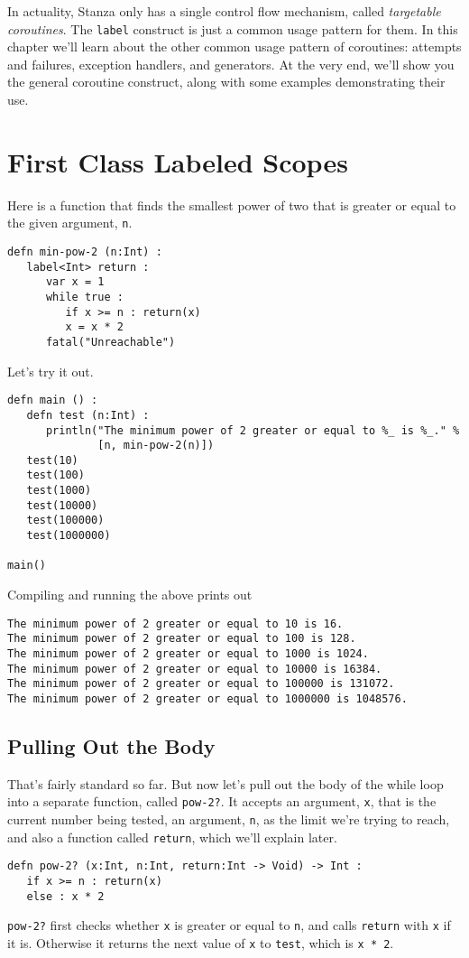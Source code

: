 \documentclass[10pt,oneside]{book}
\begin{document}
In actuality, Stanza only has a single control flow mechanism, called {\em targetable coroutines}. The \texttt{\frenchspacing label} construct is just a common usage pattern for them. In this chapter we'll learn about the other common usage pattern of coroutines: attempts and failures, exception handlers, and generators. At the very end, we'll show you the general coroutine construct, along with some examples demonstrating their use.

\section{First Class Labeled Scopes}
Here is a function that finds the smallest power of two that is greater or equal to the given argument, \texttt{\frenchspacing n}.
\begin{lstlisting}
defn min-pow-2 (n:Int) :
   label<Int> return :
      var x = 1
      while true :
         if x >= n : return(x)
         x = x * 2
      fatal("Unreachable")   
\end{lstlisting}

Let's try it out.
\begin{lstlisting}
defn main () :
   defn test (n:Int) :
      println("The minimum power of 2 greater or equal to %_ is %_." %
              [n, min-pow-2(n)])
   test(10)
   test(100)
   test(1000)
   test(10000)
   test(100000)
   test(1000000)

main()
\end{lstlisting}

Compiling and running the above prints out
\begin{lstlisting}
The minimum power of 2 greater or equal to 10 is 16.
The minimum power of 2 greater or equal to 100 is 128.
The minimum power of 2 greater or equal to 1000 is 1024.
The minimum power of 2 greater or equal to 10000 is 16384.
The minimum power of 2 greater or equal to 100000 is 131072.
The minimum power of 2 greater or equal to 1000000 is 1048576.
\end{lstlisting}

\subsection*{Pulling Out the Body}
That's fairly standard so far. But now let's pull out the body of the while loop into a separate function, called \texttt{\frenchspacing pow-2?}. It accepts an argument, \texttt{\frenchspacing x}, that is the current number being tested, an argument, \texttt{\frenchspacing n}, as the limit we're trying to reach, and also a function called \texttt{\frenchspacing return}, which we'll explain later.
\begin{lstlisting}
defn pow-2? (x:Int, n:Int, return:Int -> Void) -> Int :
   if x >= n : return(x)
   else : x * 2
\end{lstlisting}
\texttt{\frenchspacing pow-2?} first checks whether \texttt{\frenchspacing x} is greater or equal to \texttt{\frenchspacing n}, and calls \texttt{\frenchspacing return} with \texttt{\frenchspacing x} if it is. Otherwise it returns the next value of \texttt{\frenchspacing x} to \texttt{\frenchspacing test}, which is \texttt{\frenchspacing x * 2}.
\end{document}

